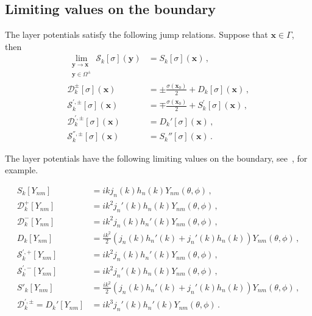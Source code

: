 \documentclass[11pt]{article}
\newcommand\bx{\boldsymbol x}
\newcommand\by{\boldsymbol y}
\newcommand\cS{\mathcal{S}}
\newcommand\cD{\mathcal{D}}
\theoremstyle{definition}
\theoremstyle{remark}
\numberwithin{equation}{section}
\begin{document}
\subsection*{Limiting values on the boundary}
The layer potentials satisfy the following jump relations. 
Suppose that $\bx \in \Gamma$, then 
\begin{equation}
\label{eq:identites}
\begin{aligned}
\lim_{\substack{\by \to  \bx \\ \by \in \Omega^{\pm}}} \cS_{k} [\sigma](\by) &= S_{k}[\sigma](\bx) \, ,\\
\cD^{\pm}_{k} [\sigma](\bx) &= \pm \frac{\sigma(\bx_{0})}{2} +  D_{k}[\sigma](\bx) \, ,\\
\cS^{',\pm}_{k} [\sigma](\bx) &= \mp \frac{\sigma(\bx_{0})}{2} +  S_{k}^{'}[\sigma](\bx) \, ,\\
\cD^{',\pm}_{k} [\sigma](\bx) &= D_{k}'[\sigma](\bx) \, ,\\
\cS^{'',\pm}_{k} [\sigma](\bx) &= S_{k}''[\sigma](\bx) \, .
\end{aligned}
\end{equation}

The layer potentials have the following limiting values on the boundary, see~\cite{felipe}, for example.

\begin{equation}
\begin{aligned}
S_{k}[Y_{nm}] &= i k j_{n}(k)h_{n}(k) Y_{nm}(\theta, \phi) \, , \\
\cD^{+}_{k}[Y_{nm}] &= i k^2 j_{n}'(k)h_{n}(k) Y_{nm}(\theta, \phi) \, , \\
\cD^{-}_{k}[Y_{nm}] &= i k^2 j_{n}(k)h_{n}'(k) Y_{nm}(\theta, \phi) \, , \\
D_{k}[Y_{nm}] &= \frac{i k^2}{2} \left(j_{n}(k)h_{n}'(k)  + j_{n}'(k)h_{n}(k) \right)Y_{nm}(\theta, \phi) \, , \\
\cS^{',+}_{k}[Y_{nm}] &= i k^2 j_{n}(k)h_{n}'(k) Y_{nm}(\theta, \phi) \, , \\
\cS^{',-}_{k}[Y_{nm}] &= i k^2 j_{n}'(k)h_{n}(k) Y_{nm}(\theta, \phi) \, , \\
S'_{k}[Y_{nm}] &= \frac{i k^2}{2} \left(j_{n}(k)h_{n}'(k)  + j_{n}'(k)h_{n}(k) \right)Y_{nm}(\theta, \phi) \, , \\
\cD_{k}^{',\pm} = D_{k}'[Y_{nm}] &= ik^3 j_{n}'(k) h_{n}'(k) Y_{nm}(\theta, \phi) \, .
\end{aligned}
\end{equation}
\end{document}
